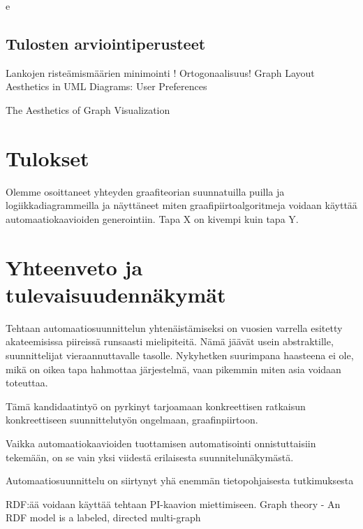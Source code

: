 e	\documentclass[finnish,12pt]{article}
\begin{document}
		\subsection{Tulosten arviointiperusteet}

Lankojen risteämismäärien minimointi !
Ortogonaalisuus!
Graph Layout Aesthetics in UML Diagrams: User Preferences

The Aesthetics of Graph Visualization

	\clearpage
	\section{Tulokset}
	
Olemme osoittaneet yhteyden graafiteorian suunnatuilla puilla ja
logiikkadiagrammeilla ja näyttäneet miten graafipiirtoalgoritmeja voidaan
käyttää automaatiokaavioiden generointiin.
Tapa X on kivempi kuin tapa Y.

	\section{Yhteenveto ja tulevaisuudennäkymät}

Tehtaan automaatiosuunnittelun yhtenäistämiseksi on vuosien varrella esitetty akateemisissa piireissä
runsaasti mielipiteitä. Nämä jäävät usein abstraktille, suunnittelijat vieraannuttavalle tasolle.
Nykyhetken suurimpana haasteena ei ole, mikä on oikea tapa hahmottaa järjestelmä, vaan pikemmin
miten asia voidaan toteuttaa.

Tämä kandidaatintyö on pyrkinyt tarjoamaan konkreettisen ratkaisun konkreettiseen suunnittelutyön ongelmaan, graafinpiirtoon. 

Vaikka automaatiokaavioiden tuottamisen automatisointi onnistuttaisiin tekemään,
on se vain yksi viidestä erilaisesta suunnitelunäkymästä.

Automaatiosuunnittelu on siirtynyt yhä enemmän tietopohjaisesta tutkimuksesta

RDF:ää voidaan käyttää tehtaan PI-kaavion miettimiseen.
Graph theory - An RDF model is a labeled, directed multi-graph


\clearpage
{}


\makeindex
\end{document}
